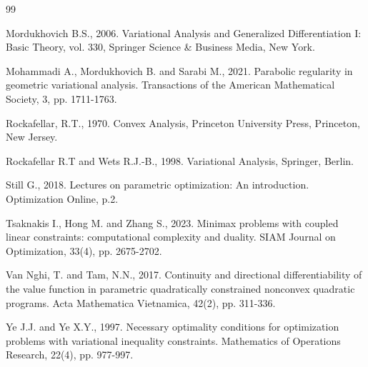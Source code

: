 \documentclass[11pt]{article}
\numberwithin{equation}{section}
\begin{document}
{\begin{thebibliography}{99}

  Mordukhovich B.S., 2006. {Variational Analysis and Generalized Differentiation I: Basic Theory, vol. 330}, Springer Science \& Business Media, New York.

 Mohammadi A., Mordukhovich B. and Sarabi M., 2021. Parabolic regularity in geometric variational analysis. Transactions of the American Mathematical Society, 3, pp. 1711-1763.






Rockafellar, R.T., 1970. Convex Analysis, Princeton University Press, Princeton, New Jersey.

 Rockafellar R.T and Wets R.J.-B., 1998. Variational Analysis, Springer, Berlin.

 Still G., 2018. Lectures on parametric optimization: An introduction. Optimization Online, p.2.

 Tsaknakis I., Hong M. and Zhang S., 2023. Minimax problems with coupled linear constraints: computational complexity and duality. SIAM Journal on Optimization, 33(4), pp. 2675-2702.

 Van Nghi, T. and Tam, N.N., 2017. Continuity and directional differentiability of the value function in parametric quadratically constrained nonconvex quadratic programs. Acta Mathematica Vietnamica, 42(2), pp. 311-336.

 Ye J.J. and Ye X.Y., 1997. Necessary optimality conditions for optimization problems with variational inequality constraints. Mathematics of Operations Research, 22(4), pp. 977-997.



\end{thebibliography}}
\end{document}

